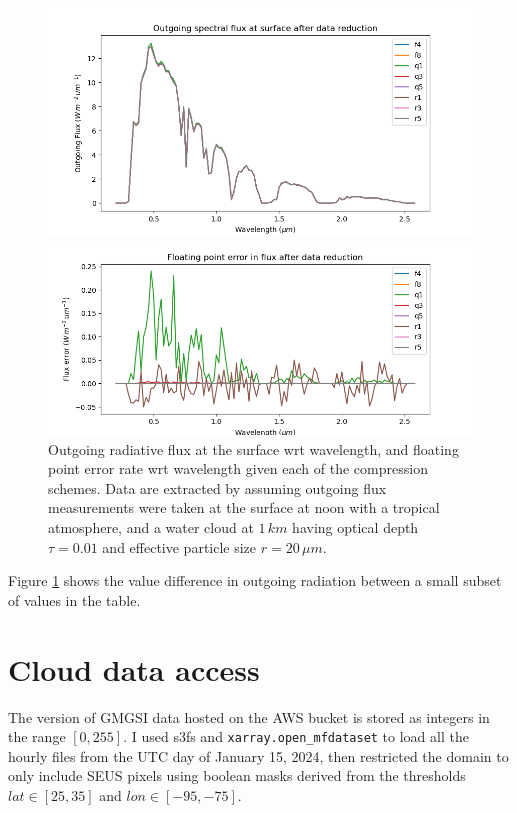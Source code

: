 \documentclass[12pt]{article}
\begin{document}
\begin{figure}[h!]
    \centering
    \includegraphics[width=.8\paperwidth]{figs/sflux.png}

    \includegraphics[width=.8\paperwidth]{figs/error.png}
    \caption{Outgoing radiative flux at the surface wrt wavelength, and floating point error rate wrt wavelength given each of the compression schemes. Data are extracted by assuming outgoing flux measurements were taken at the surface at noon with a tropical atmosphere, and a water cloud at $1\,\si{km}$ having optical depth $\tau=0.01$ and effective particle size $r=20\,\si{\mu m}$.}
    \label{sflux}
\end{figure}

Figure \ref{sflux} shows the value difference in outgoing radiation between a small subset of values in the table.

\section{Cloud data access}

The version of GMGSI data hosted on the AWS bucket is stored as integers in the range $[0,255]$. I used s3fs and \texttt{xarray.open\_mfdataset} to load all the hourly files from the UTC day of January 15, 2024, then restricted the domain to only include SEUS pixels using boolean masks derived from the thresholds $lat \in [25,35]$ and $lon \in [-95,-75]$.
\end{document}
